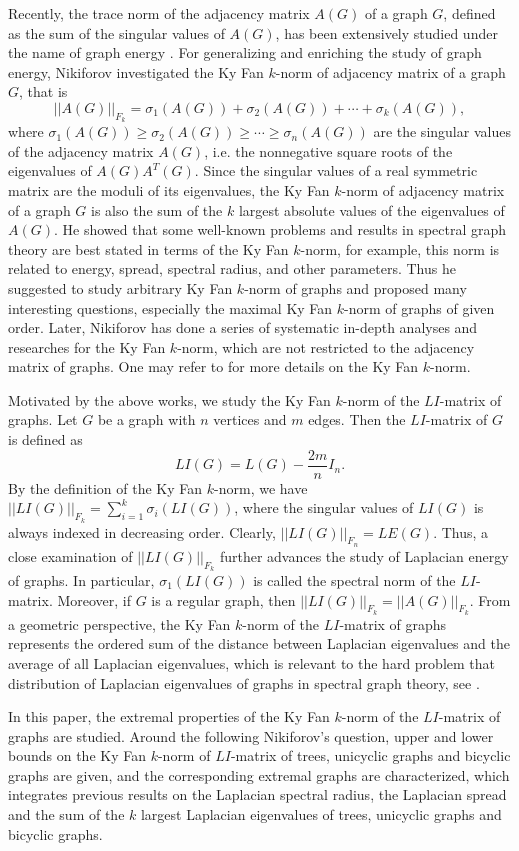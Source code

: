 \documentclass[12pt, a4paper]{article}
\begin{document}
Recently, the trace norm of the adjacency matrix $A(G)$ of a graph $G$, defined as the sum of the singular values of $A(G)$, has been extensively studied under the name of graph energy \cite{LSG}. For generalizing and enriching the study of graph energy, Nikiforov \cite{N, N3} investigated the Ky Fan $k$-norm of adjacency matrix of a graph $G$, that is
$$||A(G)||_{F_k}=\sigma_1(A(G))+\sigma_2(A(G))+\cdots+\sigma_k(A(G)),$$
where $\sigma_1(A(G))\geq \sigma_2(A(G))\geq \cdots\geq \sigma_n(A(G))$ are the singular values of
the adjacency matrix $A(G)$, i.e. the nonnegative square roots of the eigenvalues of $A(G)A^T(G)$. Since the singular values of a real symmetric matrix are the moduli of its eigenvalues, the Ky Fan $k$-norm of adjacency matrix of a graph $G$ is also the sum of the $k$ largest absolute values of the eigenvalues of $A(G)$. He showed that some well-known problems and results in spectral graph theory are best stated in terms of the Ky Fan $k$-norm, for example, this norm is related to energy, spread, spectral radius, and other parameters. Thus he suggested to study arbitrary Ky Fan $k$-norm of graphs and proposed many interesting questions, especially the maximal Ky Fan
$k$-norm of graphs of given order. Later, Nikiforov has done a series of systematic in-depth analyses and researches for the Ky Fan
$k$-norm, which are not restricted to the adjacency matrix of graphs. One may refer to \cite{N, N1, N2, N3, NY} for more details on the Ky Fan $k$-norm.


Motivated by the above works, we study the Ky Fan $k$-norm of the $LI$-matrix of graphs. Let $G$ be a graph with $n$ vertices and $m$ edges. Then the $LI$-matrix of $G$ is defined as
$$LI(G)=L(G)-\frac{2m}{n}I_n.$$
 By the definition of the Ky Fan $k$-norm, we have
$||LI(G)||_{F_k}=\sum_{i=1}^{k}\sigma_i(LI(G))$,
where the singular values of $LI(G)$ is always indexed in decreasing order.
Clearly, $||LI(G)||_{F_n}=LE(G)$. Thus, a close examination of $||LI(G)||_{F_k}$ further advances the study of Laplacian energy of graphs.
In particular, $\sigma_1(LI(G))$ is called the spectral norm of the $LI$-matrix. Moreover, if $G$ is a regular graph, then $||LI(G)||_{F_k}=||A(G)||_{F_k}$.
From a geometric perspective, the Ky Fan $k$-norm of the $LI$-matrix of graphs represents the ordered sum of the distance between Laplacian eigenvalues and the average of all Laplacian eigenvalues, which is relevant to the hard problem that distribution of Laplacian eigenvalues of graphs in spectral graph theory, see \cite{JOT}.


In this paper, the extremal properties of the Ky Fan $k$-norm of the $LI$-matrix of graphs are studied. Around the following Nikiforov's question, upper and lower bounds on the Ky Fan $k$-norm of $LI$-matrix of trees, unicyclic graphs and bicyclic graphs are given, and the corresponding extremal graphs are characterized, which integrates previous results on the Laplacian spectral radius, the Laplacian spread and the sum of the $k$ largest Laplacian eigenvalues of trees, unicyclic graphs and bicyclic graphs.
\end{document}
